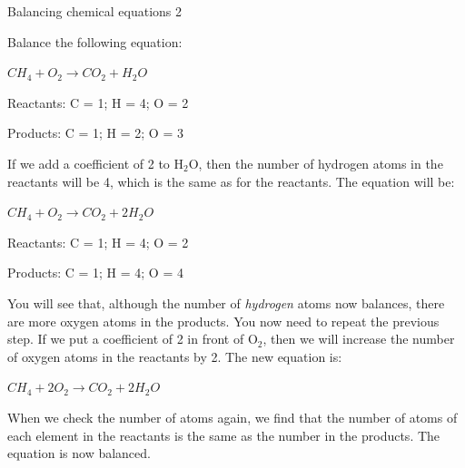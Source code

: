 \begin{wex}{Balancing chemical equations 2}{Balance the following equation:
\begin{center}
\rm${CH_{4} + O_{2} \rightarrow CO_{2} + H_{2}O}$
\end{center}
}

{

Reactants: C = 1; H = 4; O = 2

Products: C = 1; H = 2; O = 3\\
}

{

If we add a coefficient of 2 to H$_{2}$O, then the number of hydrogen atoms in the reactants will be 4, which is the same as for the reactants. The equation will be:

\begin{center}
\rm${CH_{4} + O_{2} \rightarrow CO_{2} + 2H_{2}O}$\\
\end{center}
}

{

Reactants: C = 1; H = 4; O = 2

Products: C = 1; H = 4; O = 4

You will see that, although the number of \textit{hydrogen} atoms now balances, there are more oxygen atoms in the products. You now need to repeat the previous step. If we put a coefficient of 2 in front of O$_{2}$, then we will increase the number of oxygen atoms in the reactants by 2. The new equation is:

\begin{center}
\rm${CH_{4} + 2O_{2} \rightarrow CO_{2} + 2H_{2}O}$
\end{center}

When we check the number of atoms again, we find that the number of atoms of each element in the reactants is the same as the number in the products. The equation is now balanced.
}
\end{wex}
    \noindent
\label{m38726*secfhsst!!!underscore!!!id501}\vspace{.5cm} 
      \noindent
